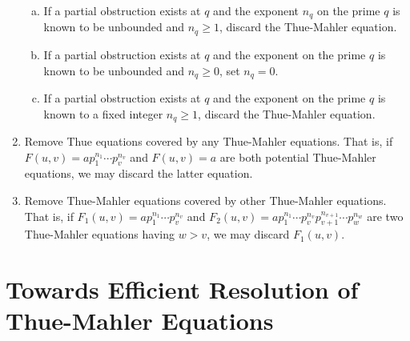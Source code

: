 \documentclass[11pt]{report}
\theoremstyle{definition}
\begin{document}
\begin{enumerate}[1.]
  \begin{enumerate}[a.]
  \item If a partial obstruction exists at $q$ and the exponent $n_q$ on the prime $q$ is known to be unbounded and $n_q \geq 1$, discard the Thue-Mahler equation.
  \item If a partial obstruction exists at $q$ and the exponent on the prime $q$ is known to be unbounded and $n_q \geq 0$, set $n_q = 0$.
  \item If a partial obstruction exists at $q$ and the exponent on the prime $q$ is known to a fixed integer $n_q \geq 1$, discard the Thue-Mahler equation.
  \end{enumerate}
\item Remove Thue equations covered by any Thue-Mahler equations. That is, if $F(u,v) = ap_1^{n_1}\cdots p_v^{n_v}$ and $F(u,v) = a$ are both potential Thue-Mahler equations, we may discard the latter equation.
\item Remove Thue-Mahler equations covered by other Thue-Mahler equations. That is, if $F_1(u,v) = ap_1^{n_1}\cdots p_v^{n_v}$ and $F_2(u,v) = ap_1^{n_1}\cdots p_v^{n_v}p_{v+1}^{n_{v+1}}\cdots p_w^{n_w}$ are two Thue-Mahler equations having $w > v$, we may discard $F_1(u,v)$.
\end{enumerate}


\chapter{Towards Efficient Resolution of Thue-Mahler Equations}
\label{ch:EfficientTMSolver}
\end{document}
